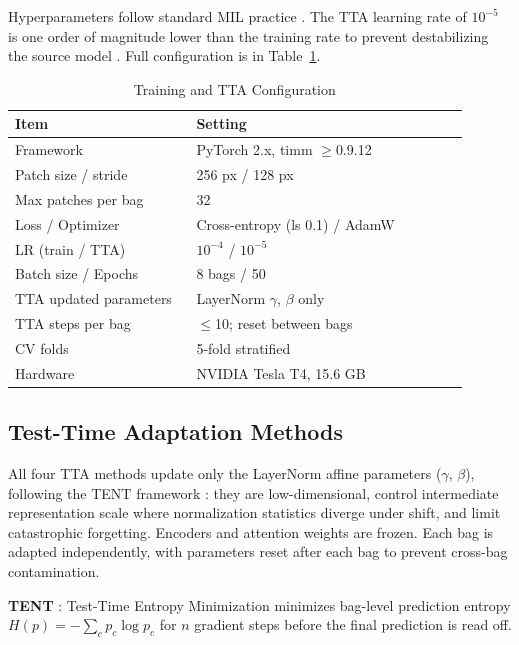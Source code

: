 \documentclass[conference]{IEEEtran}
\begin{document}
Hyperparameters follow standard MIL practice \cite{lu2021data, shao2021transmil}. The TTA learning rate of $10^{-5}$ is one order of magnitude lower than the training rate to prevent destabilizing the source model \cite{wang2021tent}. Full configuration is in Table~\ref{tab:training}.

\begin{table}[!hbt]
\caption{Training and TTA Configuration}
\label{tab:training}
\centering
\begin{tabular}{p{0.36\linewidth} p{0.54\linewidth}}
\toprule
\textbf{Item} & \textbf{Setting} \\
\midrule
Framework & PyTorch 2.x, timm $\geq$0.9.12 \\
Patch size / stride & 256 px / 128 px \\
Max patches per bag & 32 \\
Loss / Optimizer & Cross-entropy (ls 0.1) / AdamW \\
LR (train / TTA) & $10^{-4}$ / $10^{-5}$ \\
Batch size / Epochs & 8 bags / 50 \\
TTA updated parameters & LayerNorm $\gamma$, $\beta$ only \\
TTA steps per bag & $\leq$10; reset between bags \\
CV folds & 5-fold stratified \\
Hardware & NVIDIA Tesla T4, 15.6 GB \\
\bottomrule
\end{tabular}
\end{table}

\subsection{Test-Time Adaptation Methods}

All four TTA methods update only the LayerNorm affine parameters ($\gamma$, $\beta$), following the TENT framework \cite{wang2021tent}: they are low-dimensional, control intermediate representation scale where normalization statistics diverge under shift, and limit catastrophic forgetting. Encoders and attention weights are frozen. Each bag is adapted independently, with parameters reset after each bag to prevent cross-bag contamination.

\textbf{TENT} \cite{wang2021tent}: Test-Time Entropy Minimization minimizes bag-level prediction entropy $H(p) = -\sum_c p_c \log p_c$ for $n$ gradient steps before the final prediction is read off.
\end{document}
